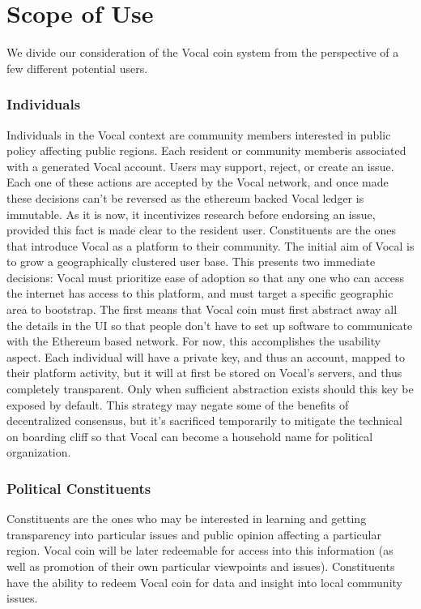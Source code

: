 \documentclass[conference]{IEEEtran}
\begin{document}
    \section{Scope of Use}

    We divide our consideration of the Vocal coin system from the perspective of a few different potential users.

    \subsubsection{Individuals}
    Individuals in the Vocal context are community members interested in public policy affecting public regions. Each resident or community memberis associated with a generated Vocal account. Users may support, reject, or create an issue. Each one of these actions are accepted by the Vocal network, and once made these decisions can't be reversed as the ethereum backed Vocal ledger is immutable. As it is now, it incentivizes research before endorsing an issue, provided this fact is made clear to the resident user.
    Constituents are the ones that introduce Vocal as a platform to their community. The initial aim of Vocal is to grow a geographically clustered user base. This presents two immediate decisions: Vocal must prioritize ease of adoption so that any one who can access the internet has access to this platform, and must target a specific geographic area to bootstrap.
    The first means that Vocal coin must first abstract away all the details in the UI so that people don't have to set up software to communicate with the Ethereum based network. For now, this accomplishes the usability aspect. Each individual will have a private key, and thus an account, mapped to their platform activity, but it will at first be stored on Vocal's servers, and thus completely transparent. Only when sufficient abstraction exists should this key be exposed by default. This strategy may negate some of the benefits of decentralized consensus, but it's sacrificed temporarily to mitigate the technical on boarding cliff so that Vocal can become a household name for political organization. 

    \subsubsection{Political Constituents}
    Constituents are the ones who may be interested in learning and getting transparency into particular issues and public opinion affecting a particular region. Vocal coin will be later redeemable for access into this information (as well as promotion of their own particular viewpoints and issues). Constituents have the ability to redeem Vocal coin for data and insight into local community issues.
\end{document}
